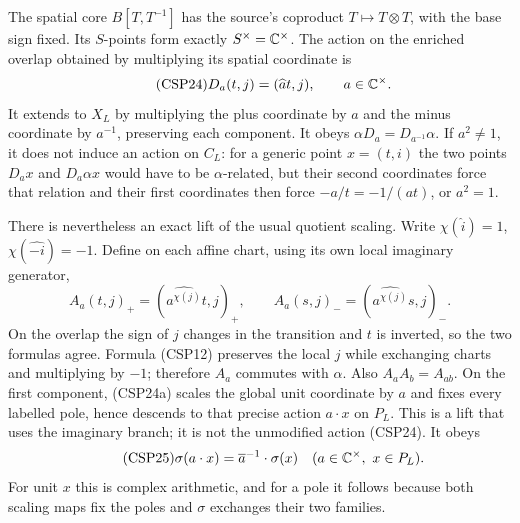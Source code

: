 The spatial core $B[T,T^{-1}]$ has the source's coproduct
$T\mapsto T\otimes T$, with the base sign fixed.  Its $S$-points
form exactly $S^\times=\mathbb C^\times$.  The action on the enriched
overlap obtained by multiplying its spatial coordinate is
\begin{equation}\tag{CSP24}
 D_a(t,j)=(\widehat a t,j),\qquad a\in\mathbb C^\times.
\end{equation}
It extends to $X_L$ by multiplying the plus coordinate by $a$ and
the minus coordinate by $a^{-1}$, preserving each component.  It
obeys $\alpha D_a=D_{a^{-1}}\alpha$.  If $a^2\ne1$, it does not
induce an action on $C_L$: for a generic point $x=(t,i)$ the two
points $D_a x$ and $D_a\alpha x$ would have to be $\alpha$-related,
but their second coordinates force that relation and their first
coordinates then force $-a/t=-1/(at)$, or $a^2=1$.

There is nevertheless an exact lift of the usual quotient scaling.
Write $\chi(\widehat i)=1$, $\chi(\widehat{-i})=-1$.  Define on
each affine chart, using its own local imaginary generator,
\begin{equation}\tag{CSP24a}
 A_a(t,j)_+=(\widehat{a^{\chi(j)}}t,j)_+,\qquad
 A_a(s,j)_-=(\widehat{a^{\chi(j)}}s,j)_-.
\end{equation}
On the overlap the sign of $j$ changes in the transition and $t$
is inverted, so the two formulas agree.  Formula (CSP12) preserves
the local $j$ while exchanging charts and multiplying by $-1$;
therefore $A_a$ commutes with $\alpha$.  Also $A_aA_b=A_{ab}$.
On the first component, (CSP24a) scales the global unit coordinate
by $a$ and fixes every labelled pole, hence descends to that precise
action $a\cdot x$ on $P_L$.  This is a lift that uses the imaginary
branch; it is not the unmodified action (CSP24).  It obeys
\begin{equation}\tag{CSP25}
 \sigma(a\cdot x)=\overline a^{-1}\cdot\sigma(x)
 \quad(a\in\mathbb C^\times,\ x\in P_L).
\end{equation}
For unit $x$ this is complex arithmetic, and for a pole it follows
because both scaling maps fix the poles and $\sigma$ exchanges their
two families.

